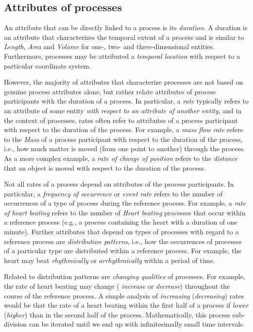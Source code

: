 \documentclass{bioinfo}
\begin{document}
\subsection{Attributes of processes}
An attribute that can be directly linked to a process is its {\em
  duration}. A duration is an attribute that characterizes the
temporal extent of a process and is similar to {\em Length}, {\em
  Area} and {\em Volume} for one-, two- and three-dimensional
entities. Furthermore, processes may be attributed a {\em temporal
  location} with respect to a particular coordinate system.

However, the majority of attributes that characterize processes are
not based on genuine process attributes alone, but rather relate
attributes of process participants with the duration of a process. In
particular, a {\em rate} typically refers to an attribute of some
entity {\em with respect to an attribute of another entity}, and in
the context of processes, rates often refer to attributes of a process
participant with respect to the duration of the process. For example,
a {\em mass flow rate} refers to the {\em Mass} of a process
participant with respect to the duration of the process, i.e., how
much matter is moved (from one point to another) through the process.
As a more complex example, a {\em rate of change of position} refers
to the {\em distance} that an object is moved with respect to the
duration of the process.

Not all rates of a process depend on attributes of the process
participants. In particular, a {\em frequency of occurrence} or {\em
  event rate} refers to the number of occurrences of a type of process
during the reference process. For example, a {\em rate of heart
  beating} refers to the number of {\em Heart beating} processes that
occur within a reference process (e.g., a process containing the heart
with a duration of one minute). Further attributes that depend on
types of processes with regard to a reference process are {\em
  distribution patterns}, i.e., how the occurrences of processes of a
particular type are distributed within a reference process. For
example, the heart may beat {\em rhythmically} or {\em arrhythmically}
within a period of time.

Related to distribution patterns are {\em changing qualities} of
processes. For example, the rate of heart beating may change ({\em
  increase} or {\em decrease}) throughout the course of the reference
process. A simple analysis of {\em increasing} ({\em decreasing})
rates would be that the rate of a heart beating within the first half
of a process if {\em lower} ({\em higher}) than in the second half of
the process. Mathematically, this process sub-division can be iterated
until we end up with infinitesimally small time intervals.
\end{document}
